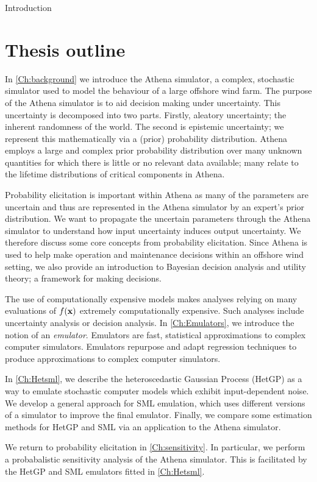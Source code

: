 \begin{chapter}{Introduction \label{Ch:Intro}}
\section{Thesis outline}

In \cref{Ch:background} we introduce the Athena simulator, a complex, stochastic simulator used to model the behaviour of a large offshore wind farm. The purpose of the Athena simulator is to aid decision making under uncertainty. This uncertainty is decomposed into two parts. Firstly, aleatory uncertainty; the inherent randomness of the world. The second is epistemic uncertainty; we represent this mathematically via a (prior) probability distribution. Athena employs a large and complex prior probability distribution over many unknown quantities for which there is little or no relevant data available; many relate to the lifetime distributions of critical components in Athena.

Probability elicitation is important within Athena as many of the parameters are uncertain and thus are represented in the Athena simulator by an expert's prior distribution. We want to propagate the uncertain parameters through the Athena simulator to understand how input uncertainty induces output uncertainty. We therefore discuss some core concepts from probability elicitation. Since Athena is used to help make operation and maintenance decisions within an offshore wind setting, we also provide an introduction to Bayesian decision analysis and utility theory; a framework for making decisions.

The use of computationally expensive models makes analyses relying on many evaluations of $f(\mathbf{x})$ extremely computationally expensive. Such analyses include uncertainty analysis or decision analysis. In \cref{Ch:Emulators}, we introduce the notion of an \textit{emulator}. Emulators are fast, statistical approximations to complex computer simulators. Emulators repurpose and adapt regression techniques to produce approximations to complex computer simulators.

In \cref{Ch:Hetsml}, we describe the heteroscedastic Gaussian Process (HetGP) as a way to emulate stochastic computer models which exhibit input-dependent noise. We develop a general approach for SML emulation, which uses different versions of a simulator to improve the final emulator. Finally, we compare some estimation methods for HetGP and SML via an application to the Athena simulator.

We return to probability elicitation in \cref{Ch:sensitivity}. In particular, we perform a probabalistic sensitivity analysis of the Athena simulator. This is facilitated by the HetGP and SML emulators fitted in \cref{Ch:Hetsml}.


\end{chapter}
